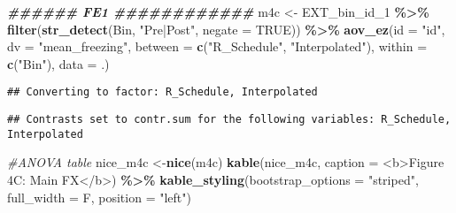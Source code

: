 \documentclass[
]{article}
\newenvironment{Shaded}{\begin{snugshade}}{\end{snugshade}}
\newcommand{\AttributeTok}[1]{\textcolor[rgb]{0.13,0.29,0.53}{#1}}
\newcommand{\CommentTok}[1]{\textcolor[rgb]{0.56,0.35,0.01}{\textit{#1}}}
\newcommand{\ConstantTok}[1]{\textcolor[rgb]{0.56,0.35,0.01}{#1}}
\newcommand{\DocumentationTok}[1]{\textcolor[rgb]{0.56,0.35,0.01}{\textbf{\textit{#1}}}}
\newcommand{\FunctionTok}[1]{\textcolor[rgb]{0.13,0.29,0.53}{\textbf{#1}}}
\newcommand{\NormalTok}[1]{#1}
\newcommand{\OtherTok}[1]{\textcolor[rgb]{0.56,0.35,0.01}{#1}}
\newcommand{\SpecialCharTok}[1]{\textcolor[rgb]{0.81,0.36,0.00}{\textbf{#1}}}
\newcommand{\StringTok}[1]{\textcolor[rgb]{0.31,0.60,0.02}{#1}}
\begin{document}
\begin{Shaded}
\begin{Highlighting}[]
\DocumentationTok{\#\#\#\#\#\# FE1 \#\#\#\#\#\#\#\#\#\#\#\#}
\NormalTok{m4c }\OtherTok{\textless{}{-}}\NormalTok{ EXT\_bin\_id\_1 }\SpecialCharTok{\%\textgreater{}\%}
  \FunctionTok{filter}\NormalTok{(}\FunctionTok{str\_detect}\NormalTok{(Bin, }\StringTok{"Pre|Post"}\NormalTok{, }\AttributeTok{negate =} \ConstantTok{TRUE}\NormalTok{)) }\SpecialCharTok{\%\textgreater{}\%}
  \FunctionTok{aov\_ez}\NormalTok{(}\AttributeTok{id =} \StringTok{"id"}\NormalTok{,}
         \AttributeTok{dv =} \StringTok{"mean\_freezing"}\NormalTok{,}
         \AttributeTok{between =} \FunctionTok{c}\NormalTok{(}\StringTok{"R\_Schedule"}\NormalTok{, }\StringTok{"Interpolated"}\NormalTok{),}
         \AttributeTok{within =} \FunctionTok{c}\NormalTok{(}\StringTok{"Bin"}\NormalTok{),}
         \AttributeTok{data =}\NormalTok{ .)}
\end{Highlighting}
\end{Shaded}

\begin{verbatim}
## Converting to factor: R_Schedule, Interpolated
\end{verbatim}

\begin{verbatim}
## Contrasts set to contr.sum for the following variables: R_Schedule, Interpolated
\end{verbatim}

\begin{Shaded}
\begin{Highlighting}[]
\CommentTok{\#ANOVA table}
\NormalTok{nice\_m4c }\OtherTok{\textless{}{-}}\FunctionTok{nice}\NormalTok{(m4c)}
\FunctionTok{kable}\NormalTok{(nice\_m4c, }\AttributeTok{caption =} \StringTok{\textquotesingle{}\textless{}b\textgreater{}Figure 4C: Main FX\textless{}/b\textgreater{}\textquotesingle{}}\NormalTok{) }\SpecialCharTok{\%\textgreater{}\%} 
  \FunctionTok{kable\_styling}\NormalTok{(}\AttributeTok{bootstrap\_options =} \StringTok{"striped"}\NormalTok{, }\AttributeTok{full\_width =}\NormalTok{ F, }\AttributeTok{position =} \StringTok{"left"}\NormalTok{)}
\end{Highlighting}
\end{Shaded}
\end{document}

